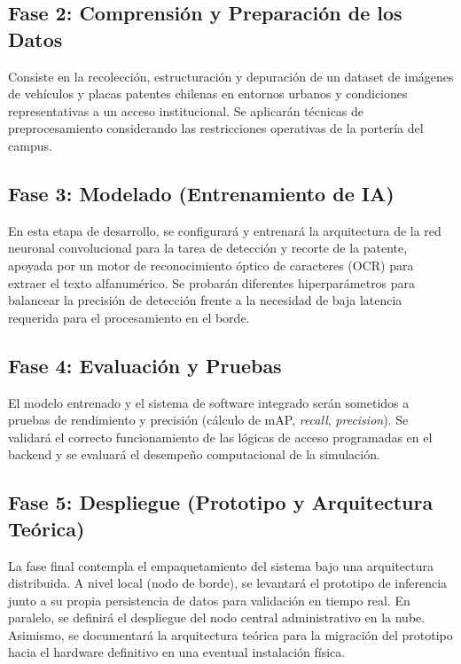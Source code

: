 \subsection{Fase 2: Comprensión y Preparación de los Datos}
Consiste en la recolección, estructuración y depuración de un dataset de imágenes de vehículos y placas patentes chilenas en entornos urbanos y condiciones representativas a un acceso institucional. Se aplicarán técnicas de preprocesamiento considerando las restricciones operativas de la portería del campus.

\subsection{Fase 3: Modelado (Entrenamiento de IA)}
En esta etapa de desarrollo, se configurará y entrenará la arquitectura de la red neuronal convolucional para la tarea de detección y recorte de la patente, apoyada por un motor de reconocimiento óptico de caracteres (OCR) para extraer el texto alfanumérico. Se probarán diferentes hiperparámetros para balancear la precisión de detección frente a la necesidad de baja latencia requerida para el procesamiento en el borde.

\subsection{Fase 4: Evaluación y Pruebas}
El modelo entrenado y el sistema de software integrado serán sometidos a pruebas de rendimiento y precisión (cálculo de mAP, \textit{recall}, \textit{precision}). Se validará el correcto funcionamiento de las lógicas de acceso programadas en el backend y se evaluará el desempeño computacional de la simulación.

\subsection{Fase 5: Despliegue (Prototipo y Arquitectura Teórica)}
La fase final contempla el empaquetamiento del sistema bajo una arquitectura distribuida. A nivel local (nodo de borde), se levantará el prototipo de inferencia junto a su propia persistencia de datos para validación en tiempo real. En paralelo, se definirá el despliegue del nodo central administrativo en la nube. Asimismo, se documentará la arquitectura teórica para la migración del prototipo hacia el hardware definitivo en una eventual instalación física.

